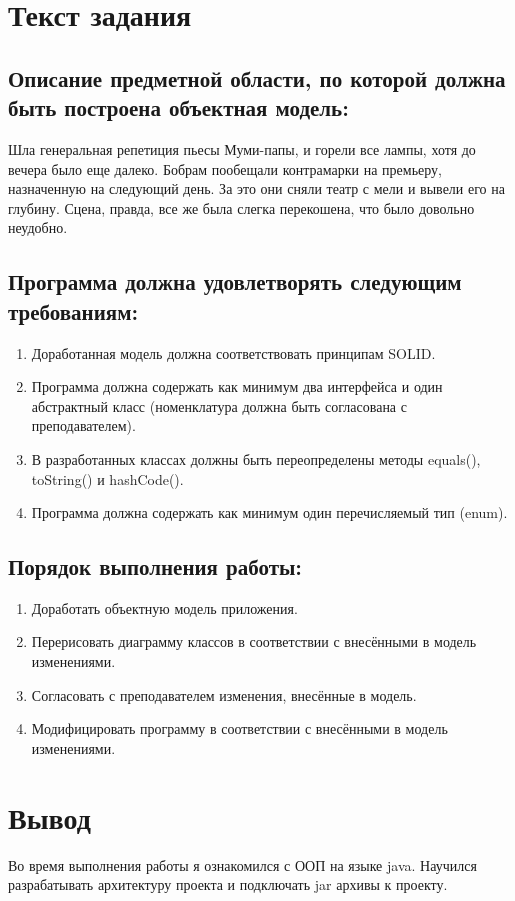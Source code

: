 



\itmo[
  variant=15677557,
  labn=3,
  discipline=Программирование,
  group=P3115,
  student=Владимир Мацюк,
  teacher=Сорокин Роман Борисович
]

\tableofcontents

\section{Текст задания}
\subsection{Описание предметной области, по которой должна быть построена объектная модель:}

Шла генеральная репетиция пьесы Муми-папы, и горели все лампы, хотя до вечера было еще далеко. Бобрам пообещали контрамарки на премьеру, назначенную на следующий день. За это они сняли театр с мели и вывели его на глубину. Сцена, правда, все же была слегка перекошена, что было довольно неудобно.
\subsection{Программа должна удовлетворять следующим требованиям:}
\begin{enumerate}
  \item Доработанная модель должна соответствовать принципам SOLID.
  \item Программа должна содержать как минимум два интерфейса и один абстрактный класс (номенклатура должна быть согласована с преподавателем).
  \item В разработанных классах должны быть переопределены методы equals(), toString() и hashCode().
  \item Программа должна содержать как минимум один перечисляемый тип (enum).
\end{enumerate}
\subsection{Порядок выполнения работы:}
\begin{enumerate}
  \item Доработать объектную модель приложения.
  \item Перерисовать диаграмму классов в соответствии с внесёнными в модель изменениями.
  \item Согласовать с преподавателем изменения, внесённые в модель.
  \item Модифицировать программу в соответствии с внесёнными в модель изменениями.
\end{enumerate}



\section{Вывод}
Во время выполнения работы я ознакомился с ООП на языке java. Научился разрабатывать архитектуру проекта и подключать jar архивы к проекту.

